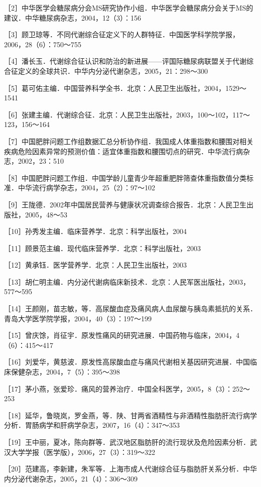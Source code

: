 ［2］中华医学会糖尿病分会MS研究协作小组．中华医学会糖尿病分会关于MS的建议．中华糖尿病杂志，2004，12（3）：156

［3］顾卫琼等．不同代谢综合征定义下的人群特征．中国医学科学院学报，2006，28（6）：750～755

［4］潘长玉．代谢综合征认识和防治的新进展------评国际糖尿病联盟关于代谢综合征定义的全球共识．中华内分泌代谢杂志，2005，21：298～300

［5］葛可佑主编．中国营养科学全书．北京：人民卫生出版社，2004，1529～1541

［6］张建主编．代谢综合征．北京：人民卫生出版社，2003，100～102，117～123，156～164

［7］中国肥胖问题工作组数据汇总分析协作组．我国成人体重指数和腰围对相关疾病危险因素异常的预测价值：适宜体重指数和腰围切点的研究．中华流行病杂志，2002，23：510

［8］中国肥胖问题工作组．中国学龄儿童青少年超重肥胖筛查体重指数值分类标准．中华流行病学杂志，2004，25（2）：97～102

［9］王陇德．2002年中国居民营养与健康状况调查综合报告．北京：人民卫生出版社，2005，48～53

［10］孙秀发主编．临床营养学．北京：科学出版社，2004

［11］顾景范主编．现代临床营养学．北京：科学出版社，2003

［12］黄承钰．医学营养学．北京：人民卫生出版社，2003

［13］胡仁明主编．内分泌代谢病临床新技术．北京：人民军医出版社，2003，577～595

［14］王颜刚，苗志敏，等．高尿酸血症及痛风病人血尿酸与胰岛素抵抗的关系．青岛大学医学院学报，2004，40（3）：197～199

［15］曾庆馀，肖征宇．原发性痛风的研究进展．中国药物与临床，2004，4（6）：415～417

［16］刘爱华，黄慈波．原发性高尿酸血症与痛风代谢相关基因研究进展．中国临床保健杂志，2004，7（5）：395～398

［17］茅小燕，张爱珍．痛风的营养治疗．中国全科医学，2005，8（3）：252～253

［18］延华，鲁晓岚，罗金燕，等．陕、甘两省酒精性与非酒精性脂肪肝流行病学分析．胃肠病学和肝病学杂志，2007，16（4）：347～353

［19］王中丽，夏冰，陈向群等．武汉地区脂肪肝的流行现状及危险因素分析．武汉大学学报（医学版），2006，27（3）：319～322

［20］范建高，李新建，朱军等．上海市成人代谢综合征与脂肪肝关系分析．中华内分泌代谢杂志，2005，21（4）：306～309

